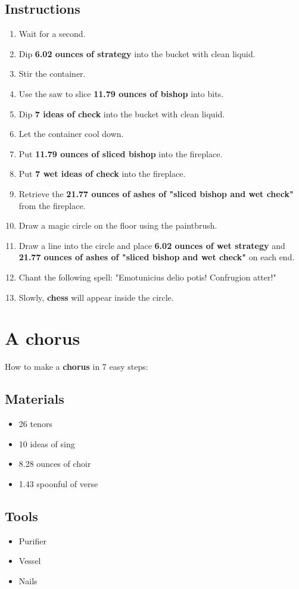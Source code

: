 \documentclass{article}
\begin{document}
\subsection{Instructions}\begin{enumerate}
\item 
Wait for a second.
\item 
Dip \textbf{6.02 ounces of strategy} into the bucket with clean liquid.
\item 
Stir the container.
\item 
Use the saw to slice \textbf{11.79 ounces of bishop} into bits.
\item 
Dip \textbf{7 ideas of check} into the bucket with clean liquid.
\item 
Let the container cool down.
\item 
Put \textbf{11.79 ounces of sliced bishop} into the fireplace.
\item 
Put \textbf{7 wet ideas of check} into the fireplace.
\item 
Retrieve the \textbf{21.77 ounces of ashes of "sliced bishop and wet check"} from the fireplace.
\item 
Draw a magic circle on the floor using the paintbrush.
\item 
Draw a line into the circle and place \textbf{6.02 ounces of wet strategy} and \textbf{21.77 ounces of ashes of "sliced bishop and wet check"} on each end.
\item 
Chant the following spell: "Emotunicius delio potis! Confrugion atter!"
\item 
Slowly, \textbf{chess} will appear inside the circle.
\end{enumerate}
\newpage
\section{A chorus}How to make a \textbf{chorus} in 7 easy steps:

\subsection{Materials}\begin{itemize}
\item 
26 tenors
\item 
10 ideas of sing
\item 
8.28 ounces of choir
\item 
1.43 spoonful of verse
\end{itemize}
\subsection{Tools}\begin{itemize}
\item 
Purifier
\item 
Vessel
\item 
Nails
\end{itemize}
\end{document}
